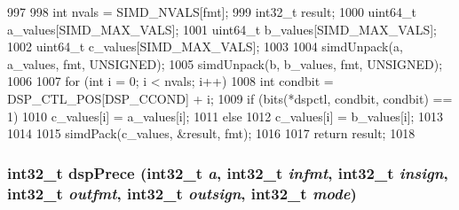 \begin{DoxyCode}
997 {
998     int nvals = SIMD_NVALS[fmt];
999     int32_t result;
1000     uint64_t a_values[SIMD_MAX_VALS];
1001     uint64_t b_values[SIMD_MAX_VALS];
1002     uint64_t c_values[SIMD_MAX_VALS];
1003 
1004     simdUnpack(a, a_values, fmt, UNSIGNED);
1005     simdUnpack(b, b_values, fmt, UNSIGNED);
1006 
1007     for (int i = 0; i < nvals; i++) {
1008         int condbit = DSP_CTL_POS[DSP_CCOND] + i;
1009         if (bits(*dspctl, condbit, condbit) == 1)
1010             c_values[i] = a_values[i];
1011         else
1012             c_values[i] = b_values[i];
1013     }
1014 
1015     simdPack(c_values, &result, fmt);
1016 
1017     return result;
1018 }
\end{DoxyCode}
\hypertarget{namespaceMipsISA_ac12488f8197cbefee846aecd70428c5c}{
\subsubsection[{dspPrece}]{\setlength{\rightskip}{0pt plus 5cm}int32\_\-t dspPrece (int32\_\-t {\em a}, \/  int32\_\-t {\em infmt}, \/  int32\_\-t {\em insign}, \/  int32\_\-t {\em outfmt}, \/  int32\_\-t {\em outsign}, \/  int32\_\-t {\em mode})}}
\label{namespaceMipsISA_ac12488f8197cbefee846aecd70428c5c}



